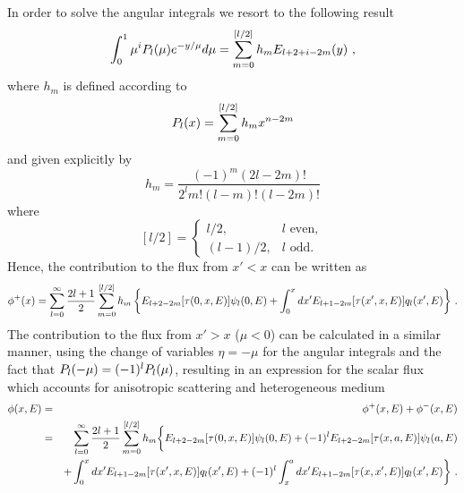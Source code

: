 In order to solve the angular integrals we resort to the following result~\cite{Cengel-1984,Settle-1994}
\begin{equation}\label{eq:Sni}
\int_0^1 { 
	\mu^i P_l(\mu) e^{-y/\mu} d\mu
}
= \sum\limits_{m=0}^{[l/2]} {
	h_m E_{l+2+i-2m}(y)
} \,\, ,
\end{equation}
where $h_m$ is defined according to 
\begin{equation}\label{eq:h_i}
P_l(x)=\sum\limits_{m=0}^{[l/2]} {
	h_m x^{n-2m}
}
\end{equation}
and given explicitly by
\begin{equation}\label{eq:h_i-explicit}
h_m = \frac{(-1)^m (2l-2m)!}{2^l m! (l-m)! (l-2m)!}
\end{equation}
where
\begin{equation}\label{eq:l_2}
[l/2] = 
\begin{cases}
l/2, & l \text{ even}, \\
(l - 1)/2, & l \text{ odd}.
\end{cases}
\end{equation}
%
Hence, the contribution to the flux from $x'<x$ can be written as
\begin{equation}\label{eq:phi+2}
\phi^+(x)= \sum\limits_{l=0}^\infty {
	\frac{2l+1}{2} \sum\limits_{m=0}^{[l/2]} { h_m
		\left\{			
			 E_{l+2-2m}[\tau(0,x,E)]			 
			 \psi_l(0,E) 
			+ 	\int_0^x { dx'
				E_{l+1-2m}[\tau(x',x,E)]
				q_l(x',E)				
		} 
	\right\}
	}
} \,\, .
\end{equation}
The contribution to the flux from $x'>x$ ($\mu<0$) can be calculated in a similar manner, using the change of variables $\eta=-\mu$ for the angular integrals and the fact that $P_l(-\mu)=(-1)^lP_l(\mu)$, resulting in an expression for the scalar flux which accounts for anisotropic scattering and heterogeneous medium
\begin{eqnarray}\label{eq:int-scalar-flux}
\phi(x,E) &=& \phi^+(x,E)+\phi^-(x,E) \nonumber \\
&=& 
\sum\limits_{l=0}^\infty  \frac{2l+1}{2} 
\sum\limits_{m=0}^{[l/2]}  h_m
\bigg\{
E_{l+2-2m}[\tau(0,x,E)]	\psi_l(0,E) 
+(-1)^l E_{l+2-2m}[\tau(x,a,E)] \psi_l(a,E) 
\nonumber \\
&&+
		\int_0^x dx' E_{l+1-2m}[\tau(x',x,E)] q_l(x',E)
		+(-1)^l \int_x^a dx' 
		E_{l+1-2m}[\tau(x,x',E)] q_l(x',E)
\bigg\}	\,\, .		
\end{eqnarray}

